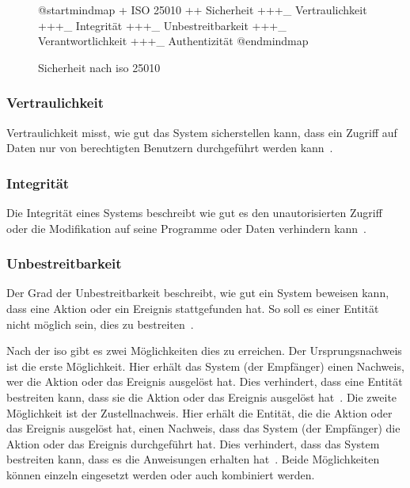 \documentclass[12pt, a4paper, ngerman]{article}
\begin{document}
\begin{figure}
  \centering
  \begin{plantuml}
    @startmindmap
    + ISO 25010
    ++ Sicherheit
    +++_ Vertraulichkeit
    +++_ Integrität
    +++_ Unbestreitbarkeit
    +++_ Verantwortlichkeit
    +++_ Authentizität
    @endmindmap
  \end{plantuml}
  \caption{Sicherheit nach \ac{iso} 25010~\cite{ISO25010}}
  \label{fig:uml:security}
\end{figure}

\subsubsection{Vertraulichkeit}

Vertraulichkeit misst, wie gut das System sicherstellen kann, 
dass ein Zugriff auf Daten nur von berechtigten Benutzern durchgeführt werden kann~\cite{ISO25010}.

\subsubsection{Integrität}

Die Integrität eines Systems beschreibt wie gut es den unautorisierten Zugriff 
oder die Modifikation auf seine Programme oder Daten verhindern kann~\cite{ISO25010}.

\subsubsection{Unbestreitbarkeit}

Der Grad der Unbestreitbarkeit beschreibt, wie gut ein System beweisen kann, 
dass eine Aktion oder ein Ereignis stattgefunden hat.
So soll es einer Entität nicht möglich sein, dies zu bestreiten~\cite{ISO25010}.

Nach der \ac{iso} gibt es zwei Möglichkeiten dies zu erreichen.
Der Ursprungsnachweis ist die erste Möglichkeit. 
Hier erhält das System (der Empfänger) einen Nachweis, wer die Aktion oder das Ereignis ausgelöst hat.
Dies verhindert, dass eine Entität bestreiten kann, dass sie die Aktion oder das Ereignis ausgelöst hat~\cite{ISO7498-2}.
Die zweite Möglichkeit ist der Zustellnachweis.
Hier erhält die Entität, die die Aktion oder das Ereignis ausgelöst hat, 
einen Nachweis, dass das System (der Empfänger) die Aktion oder das Ereignis durchgeführt hat.
Dies verhindert, dass das System bestreiten kann, dass es die Anweisungen erhalten hat~\cite{ISO7498-2}.
Beide Möglichkeiten können einzeln eingesetzt werden oder auch kombiniert werden.
\end{document}
